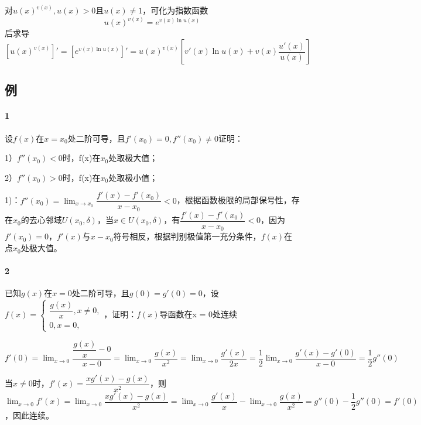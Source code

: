 对\(u(x)^{v(x)}, u(x) > 0\)且\(u(x) \neq 1\)，可化为指数函数\[u(x)^{v(x)} = e^{v(x)\ln u(x)}\]后求导\[[u(x)^{v(x)}]' = [e^{v(x)\ln u(x)}]' = u(x)^{v(x)}[v'(x)\ln u(x) + v(x)\dfrac{u'(x)}{u(x)}]\]




\subsection{例}

\paragraph{1}
设\(f(x)\)在\(x = x_0\)处二阶可导，且\(f'(x_0) = 0, f''(x_0) \neq 0\)证明：

1）\(f''(x_0) < 0\)时，f(x)在\(x_0\)处取极大值；

2）\(f''(x_0) > 0\)时，f(x)在\(x_0\)处取极小值；

1)：\(f''(x_0) = \displaystyle \lim_{x \to x_0}\dfrac{f'(x) - f'(x_0)}{x - x_0} < 0\)，根据函数极限的局部保号性，存在\(x_0\)的去心邻域\(U(x_0, \delta)\)，当\(x \in U(x_0, \delta)\)，有\(\dfrac{f'(x) - f'(x_0)}{x - x_0} < 0\)，因为\(f'(x_0) = 0\)，\(f'(x)\)与\(x - x_0\)符号相反，根据判别极值第一充分条件，\(f(x)\)在点\(x_0\)处极大值。

\paragraph{2}
已知\(g(x)\)在\(x = 0\)处二阶可导，且\(g(0) = g'(0) = 0\)，设\(f(x) = \begin{cases}
\dfrac{g(x)}{x}, x\neq 0, \\ 
0, x = 0,
\end{cases}\)，证明：\(f(x)\)导函数在x = 0处连续

\(f'(0) = \displaystyle \lim_{x \to 0}\dfrac{\dfrac{g(x)}{x} - 0}{x - 0} = \lim_{x \to 0}\dfrac{g(x)}{x^2} = \lim_{x \to 0}\dfrac{g'(x)}{2x} = \dfrac{1}{2}\lim_{x \to 0}\dfrac{g'(x) - g'(0)}{x - 0} = \dfrac{1}{2}g''(0)\)

当\(x \neq 0\)时，\(f'(x) = \dfrac{xg'(x) - g(x)}{x^2}\)，则\(\displaystyle\lim_{x \to 0}f'(x) = \lim_{x \to 0}\dfrac{xg'(x) - g(x)}{x^2} = \lim_{x \to 0}\dfrac{g'(x)}{x} - \lim_{x \to 0}\dfrac{g(x)}{x^2} = g''(0) - \dfrac{1}{2}g''(0) = f'(0)\)，因此连续。


